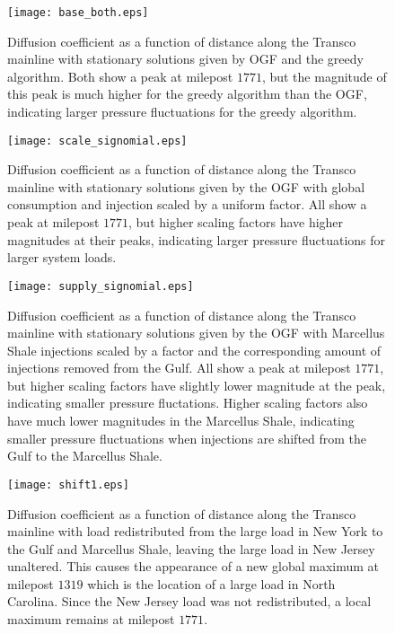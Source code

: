 \documentclass[10pt, conference, compsocconf]{IEEEtran}
\begin{document}
\begin{figure}
\centering
\texttt{[image: base\_both.eps]}
\caption{Diffusion coefficient as a function of distance along the Transco
mainline with stationary solutions given by OGF and the
greedy algorithm.  Both show a peak at milepost $1771$, but the magnitude
of this peak is much higher for the greedy algorithm than the OGF, indicating larger pressure fluctuations for the greedy algorithm.
}
\label{BBoth}
\end{figure}

\begin{figure}
\centering
\texttt{[image: scale\_signomial.eps]}
\caption{Diffusion coefficient as a function of distance along the Transco
mainline with stationary solutions given by the OGF with
global consumption and injection scaled by a uniform factor.
All show a peak at milepost $1771$, but higher scaling factors have higher
magnitudes at their peaks, indicating larger pressure fluctuations for larger
system loads.
}
\label{SSig}
\end{figure}



\begin{figure}
\centering
\texttt{[image: supply\_signomial.eps]}
\caption{Diffusion coefficient as a function of distance along the Transco
mainline with stationary solutions given by the OGF with
Marcellus Shale injections scaled by a factor and the corresponding amount
of injections removed from the Gulf.  All show a peak at milepost $1771$, but
higher scaling factors have slightly lower magnitude at the peak, indicating
smaller pressure fluctations.
Higher scaling factors also have much lower magnitudes in the Marcellus
Shale, indicating smaller pressure fluctuations when injections are shifted
from the Gulf to the Marcellus Shale.
}
\label{SuSig}
\end{figure}



\begin{figure}
\centering
\texttt{[image: shift1.eps]}
\caption{Diffusion coefficient as a function of distance along the Transco
mainline with load redistributed from the large load in New York to
the Gulf and Marcellus Shale, leaving the large load in New Jersey unaltered.
This causes the appearance of a new global maximum at milepost $1319$
which is the location of a large load in North Carolina.
Since the New Jersey load was not redistributed, a local maximum remains
at milepost $1771$.
}
\label{shift1}
\end{figure}
\end{document}
